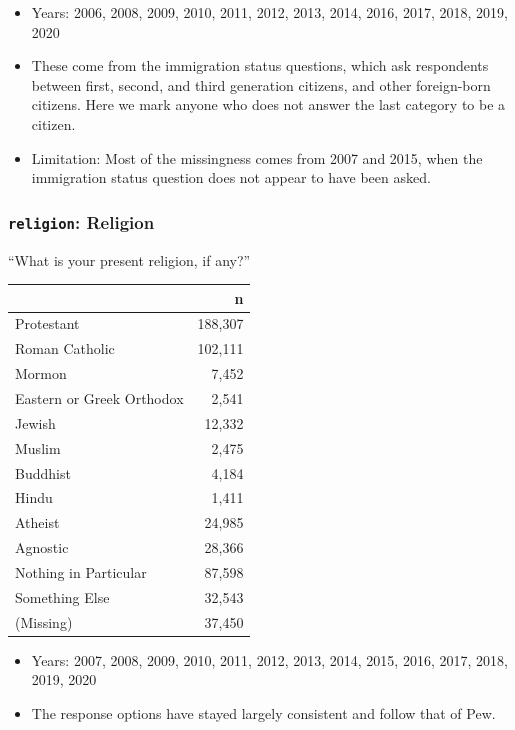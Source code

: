 \documentclass[10pt,article,oneside]{memoir}
\theoremstyle{definition}
\begin{document}
\begin{itemize}
\tightlist
\item
  Years: 2006, 2008, 2009, 2010, 2011, 2012, 2013, 2014, 2016, 2017,
  2018, 2019, 2020
\item
  These come from the immigration status questions, which ask
  respondents between first, second, and third generation citizens, and
  other foreign-born citizens. Here we mark anyone who does not answer
  the last category to be a citizen.
\item
  Limitation: Most of the missingness comes from 2007 and 2015, when the
  immigration status question does not appear to have been asked.
\end{itemize}

\hypertarget{religion-religion}{%
\subsubsection{\texorpdfstring{\texttt{religion}:
Religion}{religion: Religion}}\label{religion-religion}}

``What is your present religion, if any?''

\begin{table}[H]
\centering
\begin{tabular}[t]{lr}
\toprule
 & n\\
\midrule
Protestant & 188,307\\
Roman Catholic & 102,111\\
Mormon & 7,452\\
Eastern or Greek Orthodox & 2,541\\
Jewish & 12,332\\
Muslim & 2,475\\
Buddhist & 4,184\\
Hindu & 1,411\\
Atheist & 24,985\\
Agnostic & 28,366\\
Nothing in Particular & 87,598\\
Something Else & 32,543\\
(Missing) & 37,450\\
\bottomrule
\end{tabular}
\end{table}

\begin{itemize}
\tightlist
\item
  Years: 2007, 2008, 2009, 2010, 2011, 2012, 2013, 2014, 2015, 2016,
  2017, 2018, 2019, 2020
\item
  The response options have stayed largely consistent and follow that of
  Pew.
\end{itemize}
\end{document}
